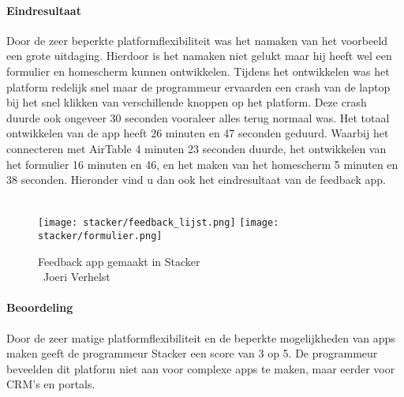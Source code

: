 \paragraph*{Eindresultaat}
Door de zeer beperkte platformflexibiliteit was het namaken van het voorbeeld een grote uitdaging. Hierdoor is het namaken niet gelukt maar hij heeft wel een formulier en homescherm
kunnen ontwikkelen. Tijdens het ontwikkelen was het platform redelijk snel maar de programmeur ervaarden een crash van de laptop bij het snel klikken van verschillende knoppen op het platform.
Deze crash duurde ook ongeveer 30 seconden vooraleer alles terug normaal was. Het totaal ontwikkelen van de app heeft 26 minuten en 47 seconden geduurd. Waarbij het connecteren met AirTable 4 minuten 23 seconden duurde, het ontwikkelen van het formulier 16 minuten en 46,
en het maken van het homescherm 5 minuten en 38 seconden. Hieronder vind u dan ook het eindresultaat van de feedback app.
\\
\\

\begin{figure}[H]
    \texttt{[image: stacker/feedback\_lijst.png]}
    \texttt{[image: stacker/formulier.png]}
    \caption[Feedback app gemaakt in Stacker]{Feedback app gemaakt in Stacker\\\textcopyright\ Joeri Verhelst}
    \label{fig:feedback-app-stacker}
\end{figure}

\paragraph*{Beoordeling}
Door de zeer matige platformflexibiliteit en de beperkte mogelijkheden van apps maken geeft de programmeur Stacker een score van 3 op 5.
De programmeur beveelden dit platform niet aan voor complexe apps te maken, maar eerder voor CRM's en portals.

